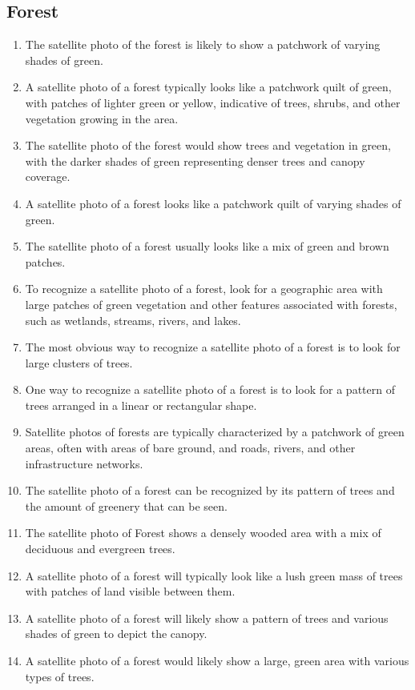 \documentclass[11pt]{article}
\begin{document}
\subsection{Forest}
\begin{enumerate}
\item The satellite photo of the forest is likely to show a patchwork of varying shades of green.
\item A satellite photo of a forest typically looks like a patchwork quilt of green, with patches of lighter green or yellow, indicative of trees, shrubs, and other vegetation growing in the area.
\item The satellite photo of the forest would show trees and vegetation in green, with the darker shades of green representing denser trees and canopy coverage.
\item A satellite photo of a forest looks like a patchwork quilt of varying shades of green.
\item The satellite photo of a forest usually looks like a mix of green and brown patches.
\item To recognize a satellite photo of a forest, look for a geographic area with large patches of green vegetation and other features associated with forests, such as wetlands, streams, rivers, and lakes.
\item The most obvious way to recognize a satellite photo of a forest is to look for large clusters of trees.
\item One way to recognize a satellite photo of a forest is to look for a pattern of trees arranged in a linear or rectangular shape.
\item Satellite photos of forests are typically characterized by a patchwork of green areas, often with areas of bare ground, and roads, rivers, and other infrastructure networks.
\item The satellite photo of a forest can be recognized by its pattern of trees and the amount of greenery that can be seen.
\item The satellite photo of Forest shows a densely wooded area with a mix of deciduous and evergreen trees.
\item A satellite photo of a forest will typically look like a lush green mass of trees with patches of land visible between them.
\item A satellite photo of a forest will likely show a pattern of trees and various shades of green to depict the canopy.
\item A satellite photo of a forest would likely show a large, green area with various types of trees.

\end{enumerate}
\end{document}
